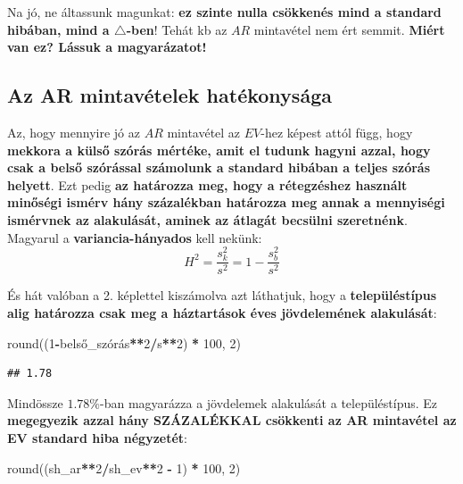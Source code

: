 \documentclass[
]{book}
\newenvironment{Shaded}{\begin{snugshade}}{\end{snugshade}}
\newcommand{\BuiltInTok}[1]{#1}
\newcommand{\DecValTok}[1]{\textcolor[rgb]{0.00,0.00,0.81}{#1}}
\newcommand{\NormalTok}[1]{#1}
\newcommand{\OperatorTok}[1]{\textcolor[rgb]{0.81,0.36,0.00}{\textbf{#1}}}
\begin{document}
Na jó, ne áltassunk magunkat: \textbf{ez szinte nulla csökkenés mind a standard hibában, mind a \(\triangle\)-ben}! Tehát kb az \(AR\) mintavétel nem ért semmit. \textbf{Miért van ez? Lássuk a magyarázatot!}

\subsection{Az AR mintavételek hatékonysága}\label{az-ar-mintavuxe9telek-hatuxe9konysuxe1ga}

Az, hogy mennyire jó az \(AR\) mintavétel az \(EV\)-hez képest attól függ, hogy \textbf{mekkora a külső szórás mértéke, amit el tudunk hagyni azzal, hogy csak a belső szórással számolunk a standard hibában a teljes szórás helyett}. Ezt pedig \textbf{az határozza meg, hogy a rétegzéshez használt minőségi ismérv hány százalékban határozza meg annak a mennyiségi ismérvnek az alakulását, aminek az átlagát becsülni szeretnénk}.
Magyarul a \textbf{variancia-hányados} kell nekünk: \[H^2 = \frac{s_k^2}{s^2} = 1-\frac{s_b^2}{s^2}\]

És hát valóban a 2. képlettel kiszámolva azt láthatjuk, hogy a \textbf{településtípus alig határozza csak meg a háztartások éves jövdelemének alakulását}:

\begin{Shaded}
\begin{Highlighting}[]
\BuiltInTok{round}\NormalTok{((}\DecValTok{1}\OperatorTok{{-}}\NormalTok{belső\_szórás}\OperatorTok{**}\DecValTok{2}\OperatorTok{/}\NormalTok{s}\OperatorTok{**}\DecValTok{2}\NormalTok{) }\OperatorTok{*} \DecValTok{100}\NormalTok{, }\DecValTok{2}\NormalTok{)}
\end{Highlighting}
\end{Shaded}

\begin{verbatim}
## 1.78
\end{verbatim}

Mindössze \(1.78\%\)-ban magyarázza a jövdelemek alakulását a településtípus. Ez \textbf{megegyezik azzal hány SZÁZALÉKKAL csökkenti az AR mintavétel az EV standard hiba négyzetét}:

\begin{Shaded}
\begin{Highlighting}[]
\BuiltInTok{round}\NormalTok{((sh\_ar}\OperatorTok{**}\DecValTok{2}\OperatorTok{/}\NormalTok{sh\_ev}\OperatorTok{**}\DecValTok{2} \OperatorTok{{-}} \DecValTok{1}\NormalTok{) }\OperatorTok{*} \DecValTok{100}\NormalTok{, }\DecValTok{2}\NormalTok{)}
\end{Highlighting}
\end{Shaded}
\end{document}
